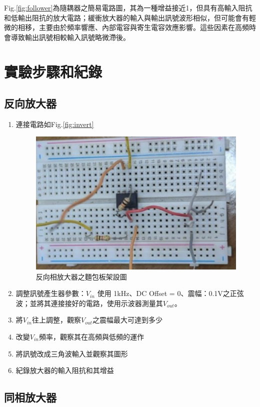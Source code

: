\documentclass[12pt,a4paper]{article}
\begin{document}
\begin{CJK}{UTF8}{bkai}
Fig.\ref{fig:follower}為隨耦器之簡易電路圖，其為一種增益接近1，但具有高輸入阻抗和低輸出阻抗的放大電路；緩衝放大器的輸入與輸出訊號波形相似，但可能會有輕微的相移，主要由於頻率響應、內部電容與寄生電容效應影響。這些因素在高頻時會導致輸出訊號相較輸入訊號略微滯後。


\clearpage
\section{實驗步驟和紀錄}

\subsection{反向放大器}\label{subsec:step_1}
\hfill


\begin{enumerate}
    \item 連接電路如Fig.\ref{fig:invert}
    \begin{figure}[h]
        \centering
        \includegraphics[width=0.7\linewidth]{figures/exp_1_step1.png}
        \caption{反向相放大器之麵包板架設圖}
        \label{fig:exp_1_step1}
    \end{figure}
    \item 調整訊號產生器參數：$V_{in}$ 使用 1kHz、DC Offset = 0、震幅：0.1V之正弦波；並將其連接接好的電路，使用示波器測量其$V_{out}$。
    \item 將$V_{in}$往上調整，觀察$V_{out}$之震幅最大可達到多少
    \item 改變$V_{in}$頻率，觀察其在高頻與低頻的運作
    \item 將訊號改成三角波輸入並觀察其圖形
    \item 紀錄放大器的輸入阻抗和其增益
\end{enumerate}

\clearpage
\subsection{同相放大器}\label{subsec:step_2}
\hfill


\end{CJK}
\end{document}
